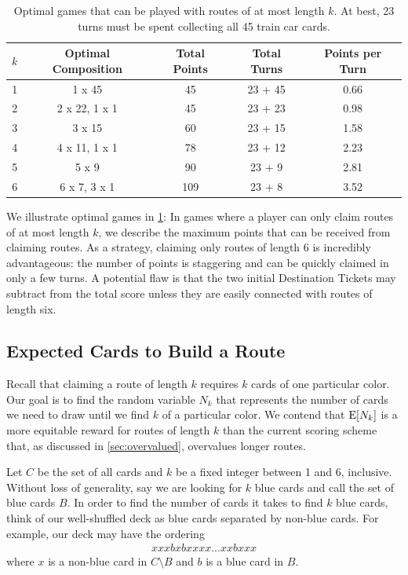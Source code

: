 \begin{table}[H]
    \renewcommand{\arraystretch}{1.5}
    \begin{tabular}{| c | c | c | c | c |}
    \hline
    $k$ & Optimal Composition & Total Points & Total Turns & 
    Points per Turn\\
    \hline
    1 & 1 x 45 & 45 & 23 + 45 & 0.66\\
    \hline
    2 & 2 x 22, 1 x 1 & 45 & 23 + 23 & 0.98\\
    \hline
    3 & 3 x 15 & 60 & 23 + 15 & 1.58\\
    \hline
    4 & 4 x 11, 1 x 1 & 78 & 23 + 12 & 2.23\\
    \hline
    5 & 5 x 9 & 90 & 23 + 9 & 2.81\\
    \hline
    6 & 6 x 7, 3 x 1 & 109 & 23 + 8 & 3.52\\
    \hline
    \end{tabular}
    \vspace{.5cm}
    \caption{Optimal games that can be played with
    routes of at most length $k$. At best,
    23 turns must be spent collecting all 45 train car
    cards.}
    \vspace{-.75cm}
    \label{table:k_games}
\end{table}

We illustrate optimal games in \cref{table:k_games}:
In games where a player can only claim routes of 
at most length $k$, we describe the maximum points
that can be received from claiming routes.
As a strategy, claiming only routes of length 6 is
incredibly advantageous: the number of points is staggering
and can be quickly claimed in only a few turns.
A potential flaw is that the two initial Destination Tickets
may subtract from the total score unless they are easily
connected with routes of length six.

\subsection{Expected Cards to Build a
Route}\label{sec:collecting_cards}
Recall that claiming a route of length $k$ requires
$k$ cards of one particular color.
Our goal is to find the random variable $N_k$ that
represents the number of cards we need to draw
until we find $k$ of a particular color.
We contend that $\operatorname{\mathrm{E}}[N_k]$ is a more equitable reward for routes
of length $k$ than the current scoring scheme that,
as discussed in \cref{sec:overvalued},
overvalues longer routes.

Let $C$ be the set of all cards and $k$ be a fixed integer
between 1 and 6, inclusive.
Without loss of generality, say we are looking
for $k$ blue cards and call the set of blue cards $B$.
In order to find the number of cards it takes 
to find $k$ blue cards,
think of our well-shuffled deck as
blue cards separated by non-blue cards.
For example, our deck may have the ordering
\begin{align}
    xxxbxbxxxx...xxbxxx \nonumber
\end{align}
where $x$ is a non-blue card in $C \setminus B$
and $b$ is a blue card in $B$.

